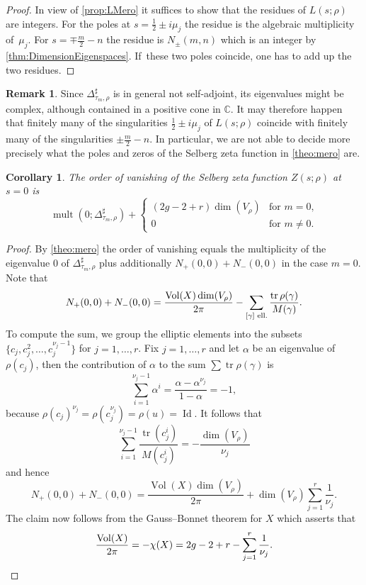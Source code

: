 \documentclass[JEP,XML,SOM,Unicode,NoFloatCountersInSection,published]{cedram}
\theoremstyle{plain}
\newtheorem{coro}[thm]{Corollary}
\theoremstyle{definition}
\newtheorem{rmrk}[thm]{Remark}
\theoremstyle{remark}
\newcommand{\C}{\mathbb{C}}
\DeclareMathOperator{\tr}{tr}
\DeclareMathOperator{\Vol}{Vol}
\DeclareMathOperator{\Id}{Id}
\numberwithin{equation}{section}
\DeclareMathOperator{\mult}{mult}
\begin{document}
\begin{proof}
In view of \cref{prop:LMero} it suffices to show that the residues of $L(s;\rho)$ are integers. For the poles at $s=\frac{1}{2}\pm i\mu_j$ the residue is the algebraic multiplicity of~$\mu_j$. For $s=\mp\frac{m}{2}-n$ the residue is $N_\pm(m,n)$ which is an integer by \cref{thm:DimensionEigenspaces}. If~these two poles coincide, one has to add up the two residues.
\end{proof}

\begin{rmrk}
Since $\Delta_{\tau_m,\rho}^\sharp$ is in general not self-adjoint, its eigenvalues might be complex, although contained in a positive cone in $\C$. It may therefore happen that finitely many of the singularities $\frac{1}{2}\pm i\mu_j$ of $L(s;\rho)$ coincide with finitely many of the singularities $\pm\frac{m}{2}-n$. In particular, we are not able to decide more precisely what the poles and zeros of the Selberg zeta function in \cref{theo:mero} are.
\end{rmrk}

\begin{coro}\label{coro:SelbergVanishingAtZero}
The order of vanishing of the Selberg zeta function $Z(s;\rho)$ at $s=0$ is
\[
\mult(0;\Delta_{\tau_m,\rho}^\sharp) + \begin{cases}(2g-2+r)\dim(V_\rho)&\mbox{for $m=0$,}\\0&\mbox{for $m\neq0$.}\end{cases}
\]
\end{coro}

\begin{proof}
By \cref{theo:mero} the order of vanishing equals the multiplicity of the eigenvalue $0$ of $\Delta_{\tau_m,\rho}^\sharp$ plus additionally $N_+(0,0)+N_-(0,0)$ in the case $m=0$. Note that
\[
N_+(0,0)+N_-(0,0) = \frac{\Vol(X)\dim(V_\rho)}{2\pi}-\sum_{[\gamma]\textup{ ell.}}\frac{\tr\rho(\gamma)}{M(\gamma)}.
\]
To compute the sum, we group the elliptic elements into the subsets $\{c_j,c_j^2,\ldots,c_j^{\nu_j-1}\}$ for $j=1,\ldots,r$. Fix $j=1,\ldots,r$ and let $\alpha$ be an eigenvalue of $\rho(c_j)$, then the contribution of $\alpha$ to the sum $\sum\tr\rho(\gamma)$ is
\[
\sum_{i=1}^{\nu_j-1}\alpha^i = \frac{\alpha-\alpha^{\nu_j}}{1-\alpha} = -1,
\]
because $\rho(c_j)^{\nu_j}=\rho(c_j^{\nu_j})=\rho(u)=\Id$. It follows that
\[
\sum_{i=1}^{\nu_j-1}\frac{\tr(c_j^i)}{M(c_j^i)} = -\frac{\dim(V_\rho)}{\nu_j}
\]
and hence
\[
N_+(0,0)+N_-(0,0) = \frac{\Vol(X)\dim(V_\rho)}{2\pi}+\dim(V_\rho)\sum_{j=1}^r\frac{1}{\nu_j}.
\]
The claim now follows from the Gauss--Bonnet theorem for $X$ which asserts that
\begin{equation}
\frac{\Vol(X)}{2\pi} = -\chi(X) = 2g-2+r-\sum_{j=1}^r\frac{1}{\nu_j}.\label{eq:GaussBonnet}\qedhere
\end{equation}
\end{proof}
\end{document}
